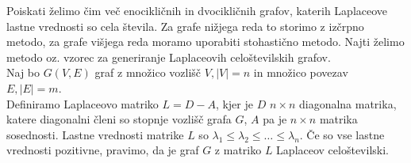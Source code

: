 \documentclass{article}
\begin{document}
Poiskati želimo čim več enocikličnih in dvocikličnih grafov, katerih Laplaceove lastne vrednosti so cela števila. 
Za grafe nižjega reda to storimo z izčrpno metodo, za grafe višjega reda moramo uporabiti stohastično metodo. 
Najti želimo metodo oz. vzorec za generiranje Laplaceovih celoštevilskih grafov. \\ 
Naj bo $G(V,E)$ graf z množico vozlišč $V, \left| V \right| = n
$ in množico povezav $E, \left| E \right| = m. $ \\
Definiramo Laplaceovo matriko $ L = D - A $, kjer je $D$ $ n \times n $ diagonalna matrika, katere diagonalni členi so stopnje vozlišč grafa $G$, 
$A$ pa je $ n \times n $ matrika sosednosti. Lastne vrednosti matrike $L$ so $ \lambda_1 \leq \lambda_2 \leq \dots \leq \lambda_n .$ Če so vse lastne
vrednosti pozitivne, pravimo, da je graf $G$ z matriko $L$ Laplaceov celoštevilski. 

\end{document}

